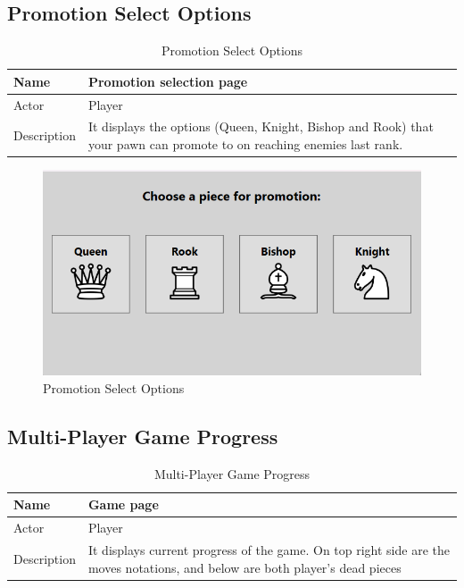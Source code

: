 \documentclass[a4paper,12pt]{article}
\begin{document}
\subsection{Promotion Select Options}

\begin{longtable}{|m{}|m{}|}
    \caption{Promotion Select Options} \\
    \hline
    Name & Promotion selection page \\
    \hline
    Actor & Player \\
    \hline
    Description & It displays the options (Queen, Knight, Bishop and Rook) that your pawn can promote to on reaching enemies last rank.\\ 
    \hline
\end{longtable}

\begin{figure}[H]
    \centering
    \includegraphics[width=0.7\linewidth]{Images/Use Cases/promotionSelectOptions.png}
    \caption{Promotion Select Options}
    \label{fig:promotionSelectOptions}
\end{figure}
    
\subsection{Multi-Player Game Progress}

\begin{longtable}{|m{}|m{}|}
    \caption{Multi-Player Game Progress} \\
    \hline
    Name & Game page \\
    \hline
    Actor & Player \\
    \hline
    Description & It displays current progress of the game. On top right side are the moves notations, and below are both player's dead pieces\\ 
    \hline
\end{longtable}
\end{document}
